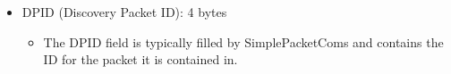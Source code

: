 \documentclass{article}
\begin{document}
\FloatBarrier

\begin{itemize}
    \item DPID (Discovery Packet ID): 4 bytes
    \begin{itemize}
        \item The DPID field is typically filled by SimplePacketComs and contains the ID for the
        packet it is contained in.
    \end{itemize}
\end{itemize}

\FloatBarrier
\end{document}
